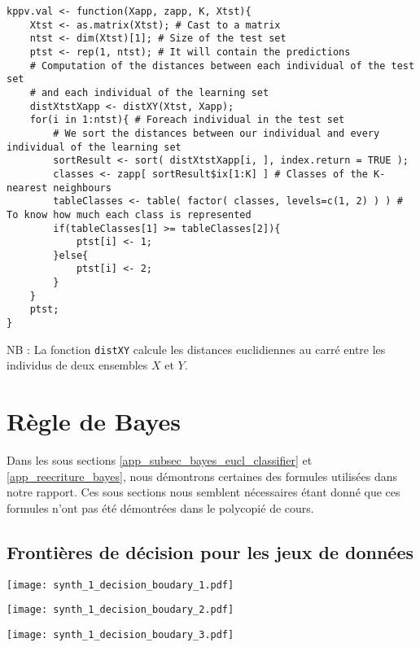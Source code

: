 \documentclass{article}
\begin{document}
\begin{multicols}{2}
\begin{lstlisting}
kppv.val <- function(Xapp, zapp, K, Xtst){
	Xtst <- as.matrix(Xtst); # Cast to a matrix
	ntst <- dim(Xtst)[1]; # Size of the test set
	ptst <- rep(1, ntst); # It will contain the predictions
	# Computation of the distances between each individual of the test set
	# and each individual of the learning set	
	distXtstXapp <- distXY(Xtst, Xapp);
	for(i in 1:ntst){ # Foreach individual in the test set
		# We sort the distances between our individual and every individual of the learning set
		sortResult <- sort( distXtstXapp[i, ], index.return = TRUE );
		classes <- zapp[ sortResult$ix[1:K] ] # Classes of the K-nearest neighbours
		tableClasses <- table( factor( classes, levels=c(1, 2) ) ) # To know how much each class is represented
		if(tableClasses[1] >= tableClasses[2]){
			ptst[i] <- 1;
		}else{
			ptst[i] <- 2;
		}
	}
	ptst;
}
\end{lstlisting}

NB : La fonction \texttt{distXY} calcule les distances euclidiennes au carré entre les individus de deux ensembles $X$ et $Y$.

\section{Règle de Bayes}
\label{app_sec_bayes}
Dans les sous sections \ref{app_subsec_bayes_eucl_classifier} et \ref{app_reecriture_bayes}, nous démontrons certaines des formules utilisées dans notre rapport. Ces sous sections nous semblent nécessaires étant donné que ces formules n'ont pas été démontrées dans le polycopié de cours.

\subsection{Frontières de décision pour les jeux de données}
\label{app_subsec_decision_boundaries}

\begingroup
   \centering
   \texttt{[image: synth\_1\_decision\_boudary\_1.pdf]}
    \label{fig_decision_boundary_40}
\endgroup

\begingroup
   \centering
   \texttt{[image: synth\_1\_decision\_boudary\_2.pdf]}
    \label{fig_decision_boundary_100}
\endgroup

\begingroup
   \centering
   \texttt{[image: synth\_1\_decision\_boudary\_3.pdf]}
    \label{fig_decision_boundary_500}
\endgroup


\end{multicols}
\end{document}
